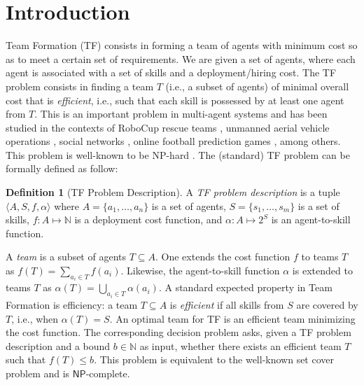 \documentclass[conference]{IEEEtran}
\theoremstyle{definition}
\newtheorem{definition}{Definition}
\begin{document}
\section{Introduction}

Team Formation (TF) consists in forming a team of agents with minimum cost so as 
to meet a certain set of requirements. 
We are given a set of agents, where each agent is associated with a set of skills and a 
deployment/hiring cost. The TF problem consists in finding a team $T$ 
(i.e., a subset of agents) of minimal overall cost that is \emph{efficient}, i.e.,
such that each skill is possessed by at least one agent from $T$. 
This is an important problem in multi-agent systems and has been studied in the 
contexts of RoboCup rescue teams \cite{DBLP:journals/aim/KitanoT01}, 
unmanned aerial vehicle operations \cite{DBLP:conf/atal/GeorgePSS10}, 
social networks \cite{KargarAZ12,FarhadiHHH12}, 
online football prediction games \cite{MatthewsRC12}, among others. 
This problem is well-known to be NP-hard \cite{DBLP:books/fm/GareyJ79,Okimoto2015}.
The (standard) TF problem \cite{Okimoto2015} can be formally defined as follow:

\begin{definition}[TF Problem Description]
	A \textit{TF problem description} is a tuple $\langle A, S, f, \alpha\rangle$ 
	where $A = \{a_1, \ldots ,a_n\}$ is a set of agents, $S = \{s_1, \ldots, s_m\}$ is a set of 
	skills, $f : A \mapsto \mathbb{N}$ is a deployment cost function, and $\alpha : A \mapsto 2^S$ is an agent-to-skill function.
	\label{def:TFpd}
\end{definition}

A \emph{team} is a subset of agents $T \subseteq A$.
One extends the cost function $f$ to teams $T$ as $f(T) = \sum_{a_i \in T}{f(a_i)}$.
Likewise, the agent-to-skill function $\alpha$ is extended to teams $T$
as $\alpha(T) = \bigcup_{a_i \in T}{\alpha(a_i)}$.
A standard expected property in Team Formation is efficiency:
a team $T \subseteq A$ is \emph{efficient} if all skills from $S$ are covered
by $T$, i.e., when $\alpha(T) = S$.  An optimal team for TF is an
efficient team minimizing the cost function.  The corresponding decision
problem asks, given a TF problem description and a
bound $b \in \mathbb{N}$ as input, whether there exists an
efficient team $T$ such that $f(T) \leq b$.  This problem is
equivalent to the well-known set cover problem
\cite{DBLP:books/fm/GareyJ79} and is $\mathsf{NP}$-complete. \\
\end{document}
